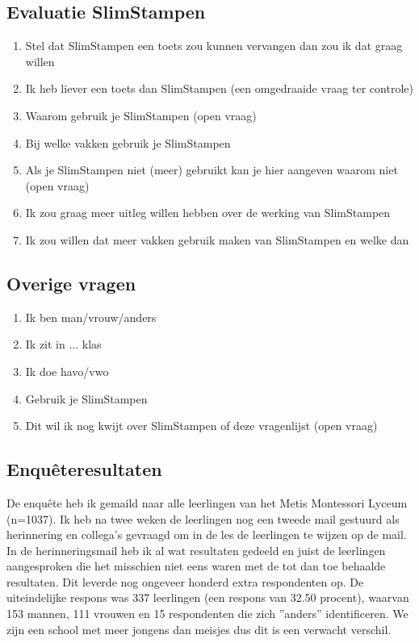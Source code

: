 \documentclass[12pt, a4paper]{article}
\begin{document}
\subsection*{Evaluatie SlimStampen}
\begin{enumerate}
    \item Stel dat SlimStampen een toets zou kunnen vervangen dan zou ik dat graag willen
    \item Ik heb liever een toets dan SlimStampen (een omgedraaide vraag ter controle)
    \item Waarom gebruik je SlimStampen (open vraag)
    \item Bij welke vakken gebruik je SlimStampen
    \item Als je SlimStampen niet (meer) gebruikt kan je hier aangeven waarom niet (open vraag)
    \item Ik zou graag meer uitleg willen hebben over de werking van SlimStampen
    \item Ik zou willen dat meer vakken gebruik maken van SlimStampen en welke dan
\end{enumerate}
\subsection*{Overige vragen}
\begin{enumerate}
    \item Ik ben man/vrouw/anders
    \item Ik zit in ... klas
    \item Ik doe havo/vwo 
    \item Gebruik je SlimStampen
    \item Dit wil ik nog kwijt over SlimStampen of deze vragenlijst (open vraag)
\end{enumerate}

\subsection*{Enquêteresultaten}
De enquête heb ik gemaild naar alle leerlingen van het Metis Montessori Lyceum (n=1037). Ik heb na twee weken de leerlingen nog een tweede mail gestuurd als herinnering en collega's gevraagd om in de les de leerlingen te wijzen op de mail. In de herinneringsmail heb ik al wat resultaten gedeeld en juist de leerlingen aangesproken die het misschien niet eens waren met de tot dan toe behaalde resultaten. Dit leverde nog ongeveer honderd extra respondenten op. De uiteindelijke respons was 337 leerlingen (een respons van 32.50 procent), waarvan 153 mannen, 111 vrouwen en 15 respondenten die zich ''anders'' identificeren. We zijn een school met meer jongens dan meisjes dus dit is een verwacht verschil. 
\end{document}
